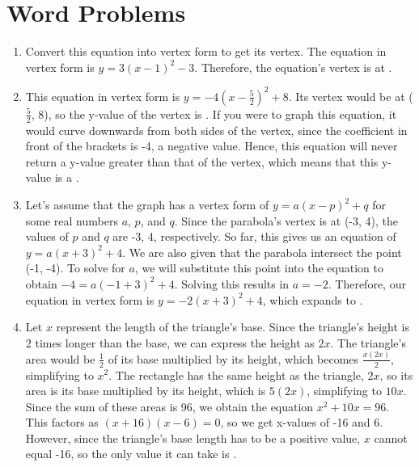 \documentclass[14pt]{extarticle}
\begin{document}
\section{Word Problems}
\begin{enumerate}
    \itemsep5.0em
    \item {Convert this equation into vertex form to get its vertex. The equation in vertex form is $y = 3(x - 1)^2 - 3$. Therefore, the equation's vertex is at .}
    \item {This equation in vertex form is $y = -4(x - \frac{5}{2})^2 + 8$. Its vertex would be at ($\frac{5}{2}$, 8), so the y-value of the vertex is . If you were to graph this equation, it would curve downwards from both sides of the vertex, since the coefficient in front of the brackets is -4, a negative value. Hence, this equation will never return a y-value greater than that of the vertex, which means that this y-value is a .}
    \item {Let's assume that the graph has a vertex form of $y = a(x - p)^2 + q$ for some real numbers $a$, $p$, and $q$. Since the parabola's vertex is at (-3, 4), the values of $p$ and $q$ are -3, 4, respectively. So far, this gives us an equation of $y = a(x + 3)^2 + 4$. We are also given that the parabola intersect the point (-1, -4). To solve for $a$, we will substitute this point into the equation to obtain $-4 = a(-1 + 3)^2 + 4$. Solving this results in $a = -2$. Therefore, our equation in vertex form is $y = -2(x + 3)^2 + 4$, which expands to .}
    \item {Let $x$ represent the length of the triangle's base. Since the triangle's height is 2 times longer than the base, we can express the height as $2x$. The triangle's area would be $\frac{1}{2}$ of its base multiplied by its height, which becomes $\frac{x(2x)}{2}$, simplifying to $x^2$. The rectangle has the same height as the triangle, $2x$, so its area is its base multiplied by its height, which is $5(2x)$, simplifying to $10x$. Since the sum of these areas is 96, we obtain the equation $x^2 + 10x = 96$. This factors as $(x + 16)(x - 6) = 0$, so we get x-values of -16 and 6. However, since the triangle's base length has to be a positive value, $x$ cannot equal -16, so the only value it can take is \fbox{6 cm}.}

\end{enumerate}
\end{document}
